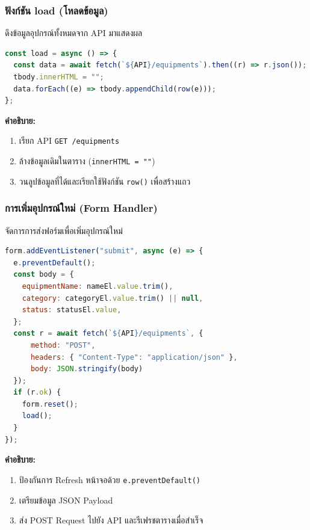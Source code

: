 \subsubsection{ฟังก์ชัน load (โหลดข้อมูล)}
ดึงข้อมูลอุปกรณ์ทั้งหมดจาก API มาแสดงผล

\begin{lstlisting}[language=JavaScript, caption={ฟังก์ชัน load ใน equipments.js}, label={code:equipments-load}]
const load = async () => {
  const data = await fetch(`${API}/equipments`).then((r) => r.json());
  tbody.innerHTML = "";
  data.forEach((e) => tbody.appendChild(row(e)));
};
\end{lstlisting}

\textbf{คำอธิบาย:}
\begin{enumerate}
    \item เรียก API \texttt{GET /equipments}
    \item ล้างข้อมูลเดิมในตาราง (\texttt{innerHTML = ""})
    \item วนลูปข้อมูลที่ได้และเรียกใช้ฟังก์ชัน \texttt{row()} เพื่อสร้างแถว
\end{enumerate}

\subsubsection{การเพิ่มอุปกรณ์ใหม่ (Form Handler)}
จัดการการส่งฟอร์มเพื่อเพิ่มอุปกรณ์ใหม่

\begin{lstlisting}[language=JavaScript, caption={Form Submit Handler ใน equipments.js}, label={code:equipments-submit}]
form.addEventListener("submit", async (e) => {
  e.preventDefault();
  const body = {
    equipmentName: nameEl.value.trim(),
    category: categoryEl.value.trim() || null,
    status: statusEl.value,
  };
  const r = await fetch(`${API}/equipments`, { 
      method: "POST", 
      headers: { "Content-Type": "application/json" }, 
      body: JSON.stringify(body) 
  });
  if (r.ok) {
    form.reset();
    load();
  }
});
\end{lstlisting}

\textbf{คำอธิบาย:}
\begin{enumerate}
    \item ป้องกันการ Refresh หน้าจอด้วย \texttt{e.preventDefault()}
    \item เตรียมข้อมูล JSON Payload
    \item ส่ง POST Request ไปยัง API และรีเฟรชตารางเมื่อสำเร็จ
\end{enumerate}

